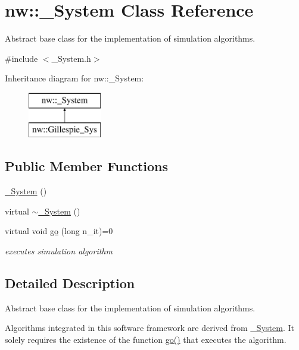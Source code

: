 \hypertarget{classnw_1_1___system}{\section{nw\+:\+:\+\_\+\+System Class Reference}
\label{classnw_1_1___system}
}


Abstract base class for the implementation of simulation algorithms.  




{\ttfamily \#include $<$\+\_\+\+System.\+h$>$}

Inheritance diagram for nw\+:\+:\+\_\+\+System\+:\begin{figure}[H]
\begin{center}
\leavevmode
\includegraphics[height=2.000000cm]{d4/d68/classnw_1_1___system}
\end{center}
\end{figure}
\subsection*{Public Member Functions}
\begin{DoxyCompactItemize}
\item 
\hyperlink{classnw_1_1___system_aecf5603295f3d88f2767aadf25db202a}{\+\_\+\+System} ()
\item 
virtual \hyperlink{classnw_1_1___system_a450424d880a58f8b1e4c460357b2356b}{$\sim$\+\_\+\+System} ()
\item 
virtual void \hyperlink{classnw_1_1___system_ae0276aebba39a971d6e240a86a389713}{go} (long n\+\_\+it)=0
\begin{DoxyCompactList}\small\item\em executes simulation algorithm \end{DoxyCompactList}\end{DoxyCompactItemize}


\subsection{Detailed Description}
Abstract base class for the implementation of simulation algorithms. 

Algorithms integrated in this software framework are derived from \hyperlink{classnw_1_1___system}{\+\_\+\+System}. It solely requires the existence of the function \hyperlink{classnw_1_1___system_ae0276aebba39a971d6e240a86a389713}{go()} that executes the algorithm. 

